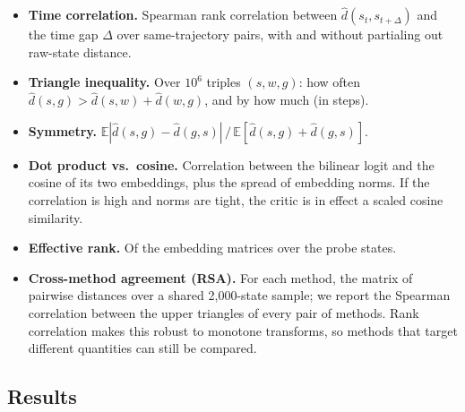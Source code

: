 \begin{itemize}
\item \textbf{Time correlation.} Spearman rank correlation between $\hat d(s_t,s_{t+\Delta})$
and the time gap $\Delta$ over same-trajectory pairs, with and without partialing out
raw-state distance.
\item \textbf{Triangle inequality.} Over $10^6$ triples $(s,w,g)$: how often
$\hat d(s,g)>\hat d(s,w)+\hat d(w,g)$, and by how much (in steps).
\item \textbf{Symmetry.} $\mathbb{E}|\hat d(s,g)-\hat d(g,s)| \,/\, \mathbb{E}[\hat d(s,g)+\hat d(g,s)]$.
\item \textbf{Dot product vs.\ cosine.} Correlation between the bilinear logit and the
cosine of its two embeddings, plus the spread of embedding norms. If the correlation is
high and norms are tight, the critic is in effect a scaled cosine similarity.
\item \textbf{Effective rank.} Of the embedding matrices over the probe states.
\item \textbf{Cross-method agreement (RSA).} For each method, the matrix of pairwise
distances over a shared 2{,}000-state sample; we report the Spearman correlation between
the upper triangles of every pair of methods. Rank correlation makes this robust to
monotone transforms, so methods that target different quantities can still be compared.
\end{itemize}

\subsection{Results}

